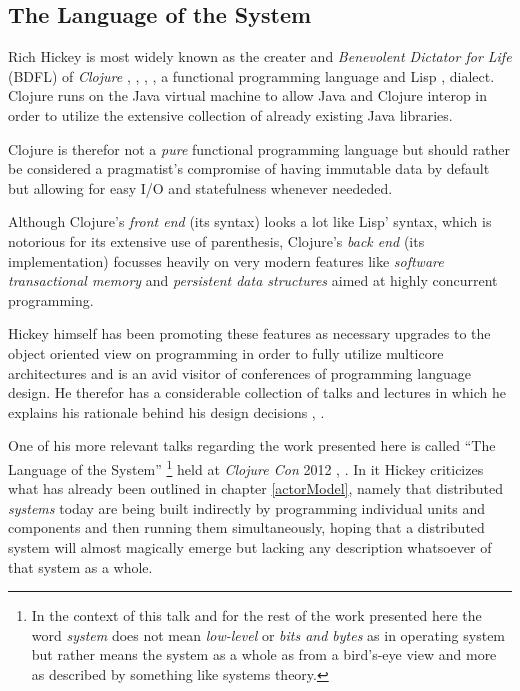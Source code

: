 \subsection{The Language of the System}
\label{LanguageOfTheSystem}

Rich Hickey is most widely known as the creater and
\textit{Benevolent Dictator for Life} (BDFL) \cite{bdfl} of
\textit{Clojure} \cite{clojure2008}, \cite{clojure2010},
\cite{clojure.org}, \cite{clojure-rationale},
a functional programming language and Lisp \cite{lisp86},
\cite{commonlisp90} dialect.
Clojure runs on the Java virtual machine to allow Java and Clojure interop
in order to utilize the extensive collection of already existing
Java libraries.

Clojure is therefor not a \textit{pure} \cite{pure}
functional programming language but should rather be considered a
pragmatist's compromise of having immutable data by default but
allowing for easy I/O and statefulness whenever neededed.

Although Clojure's \textit{front end} (its syntax) looks a lot like
Lisp' syntax, which is notorious for its extensive use of
parenthesis, Clojure's \textit{back end} (its implementation)
focusses heavily on very modern features like
\textit{software transactional memory} \cite{stm} and
\textit{persistent data structures} \cite{persistentdatastructures}
aimed at highly concurrent programming.

Hickey himself has been promoting these features as necessary
upgrades to the object oriented view on programming in order to
fully utilize multicore architectures and is an avid
visitor of conferences of programming language design. He therefor has
a considerable collection of talks and lectures in which he explains
his rationale behind his design decisions \cite{hickey-talks},
\cite{hickey-bestof}.
\newline

One of his more relevant talks regarding the work presented here
is called ``The Language of the System''
\footnote{In the context of this talk and for the rest of the work presented
here the word \textit{system} does not mean \textit{low-level} or
\textit{bits and bytes} as in operating system but rather means
the system as a whole as from a bird's-eye view and more as
described by something like systems theory.}
held at \textit{Clojure Con} 2012 \cite{hickey-systemlang},
\cite{clojurecon}.
In it Hickey criticizes what has already been outlined in
chapter \ref{actorModel}, namely that distributed \textit{systems}
today are being built indirectly by programming individual units and
components and then running them simultaneously, hoping that a
distributed system will almost magically emerge but lacking any
description whatsoever of that system as a whole.

